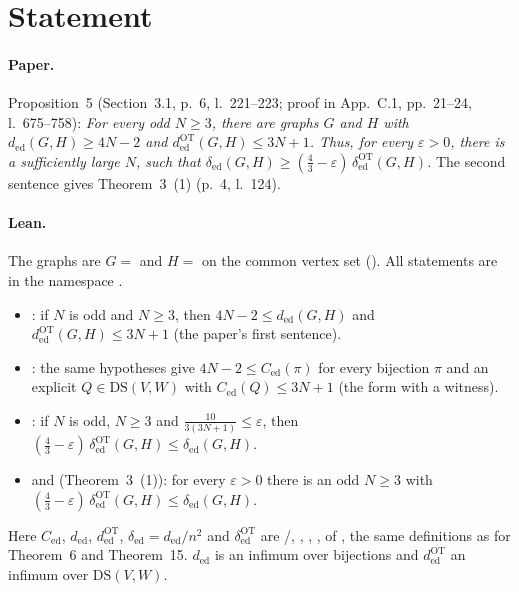 

\paperversion

\section{Statement}

\paragraph{Paper.} Proposition~5 (Section~3.1, p.~6, l.~221--223; proof in App.~C.1, pp.~21--24,
l.~675--758): \emph{For every odd $N\ge3$, there are graphs $G$ and $H$ with $d_{\mathrm{ed}}(G,H)\ge4N-2$
and $d^{\mathrm{OT}}_{\mathrm{ed}}(G,H)\le3N+1$. Thus, for every $\varepsilon>0$, there is a sufficiently
large $N$, such that $\delta_{\mathrm{ed}}(G,H)\ge(\frac43-\varepsilon)\,\delta^{\mathrm{OT}}_{\mathrm{ed}}(G,H)$.}
The second sentence gives Theorem~3~(1) (p.~4, l.~124).

\paragraph{Lean.} The graphs are $G=$  and $H=$  on the common vertex set
 (). All statements are in the namespace .
\begin{itemize}
\item {}: if $N$ is odd and $N\ge3$, then
  $4N-2\le d_{\mathrm{ed}}(G,H)$ and $d^{\mathrm{OT}}_{\mathrm{ed}}(G,H)\le3N+1$ \quad (the paper's first sentence).
\item {}: the same hypotheses give $4N-2\le C_{\mathrm{ed}}(\pi)$ for every bijection $\pi$ and
  an explicit $Q\in\mathrm{DS}(V,W)$ with $C_{\mathrm{ed}}(Q)\le3N+1$ (the form with a witness).
\item {}: if $N$ is odd, $N\ge3$ and $\frac{10}{3(3N+1)}\le\varepsilon$, then
  $(\frac43-\varepsilon)\,\delta^{\mathrm{OT}}_{\mathrm{ed}}(G,H)\le\delta_{\mathrm{ed}}(G,H)$.
\item {} and  (Theorem~3~(1)): for every $\varepsilon>0$ there is an odd
  $N\ge3$ with $(\frac43-\varepsilon)\,\delta^{\mathrm{OT}}_{\mathrm{ed}}(G,H)\le\delta_{\mathrm{ed}}(G,H)$.
\end{itemize}
Here $C_{\mathrm{ed}}$, $d_{\mathrm{ed}}$, $d^{\mathrm{OT}}_{\mathrm{ed}}$, $\delta_{\mathrm{ed}}=d_{\mathrm{ed}}/n^2$
and $\delta^{\mathrm{OT}}_{\mathrm{ed}}$ are /, , ,
,  of , the same definitions as for
Theorem~6 and Theorem~15. $d_{\mathrm{ed}}$ is an infimum over bijections and $d^{\mathrm{OT}}_{\mathrm{ed}}$ an
infimum over $\mathrm{DS}(V,W)$.

